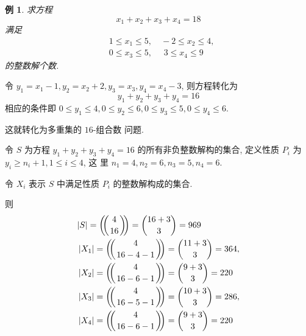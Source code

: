 \documentclass[punct]{ctexbeamer}
\newtheorem{ex}{例}
\def\sol{\noindent {\bf 解\ }}
\def\multiset#1#2{\ensuremath{\left(\kern-.3em\left(\genfrac{}{}{0pt}{}{#1}{#2}\right)\kern-.3em\right)}}
\begin{document}
\begin{frame}
\begin{ex}
求方程 $$x_{1}+x_{2}+x_{3}+x_{4}=18$$ 满足
\begin{align*}
& 1 \leq x_{1} \leq 5, \quad  -2 \leq x_{2} \leq 4,\\
& 0 \leq x_{3} \leq 5, \quad \,  \,3 \leq x_{4} \leq 9
\end{align*}
 的整数解个数.
\end{ex}
\sol 令 $y_{1}=x_{1}-1, y_{2}=x_{2}+2, y_{3}=x_{3}, y_{4}=x_{4}-3$, 则方程转化为
$$
y_{1}+y_{2}+y_{3}+y_{4}=16
$$
相应的条件即 $0 \leq y_{1} \leq 4,0 \leq y_{2} \leq 6,0 \leq y_{3} \leq 5,0 \leq y_{4} \leq 6$.

这就转化为多重集的 $16$-组合数 问题.
\end{frame}

\begin{frame}
令 $S$ 为方程 $y_{1}+y_{2}+y_{3}+y_{4}=16$ 的所有非负整数解构的集合, 定义性质 $P_{i}$ 为 $y_{i} \geq n_{i}+1,1 \leq i \leq 4$, 这 里 $n_{1}=4, n_{2}=6, n_{3}=5, n_{4}=6$.

令 $X_{i}$ 表示 $S$ 中满足性质 $P_{i}$ 的整数解构成的集合.

则
$$
\begin{aligned}
    &|S|=\multiset{4}{16}=\binom{16+3}{3}=969 \\
    &\left|X_{1}\right|=\multiset{4}{16-4-1}=\binom{11+3}{3}=364, \\
    &\left|X_{2}\right|=\multiset{4}{16-6-1}=\binom{9+3}{3}=220 \\
    &\left|X_{3}\right|=\multiset{4}{16-5-1}=\binom{10+3}{3}=286, \\
    &\left|X_{4}\right|=\multiset{4}{16-6-1}=\binom{9+3}{3}=220
\end{aligned}
$$
\end{frame}
\end{document}
